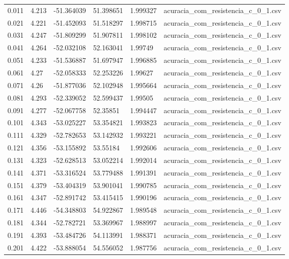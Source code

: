 \begin{table}
\begin{tabular}{llllll}
0.011 & 4.213 & -51.364039 & 51.398651 & 1.999327 & acuracia\_com\_resistencia\_c\_0\_1.csv \\
0.021 & 4.221 & -51.452093 & 51.518297 & 1.998715 & acuracia\_com\_resistencia\_c\_0\_1.csv \\
0.031 & 4.247 & -51.809299 & 51.907811 & 1.998102 & acuracia\_com\_resistencia\_c\_0\_1.csv \\
0.041 & 4.264 & -52.032108 & 52.163041 & 1.99749 & acuracia\_com\_resistencia\_c\_0\_1.csv \\
0.051 & 4.233 & -51.536887 & 51.697947 & 1.996885 & acuracia\_com\_resistencia\_c\_0\_1.csv \\
0.061 & 4.27 & -52.058333 & 52.253226 & 1.99627 & acuracia\_com\_resistencia\_c\_0\_1.csv \\
0.071 & 4.26 & -51.877036 & 52.102948 & 1.995664 & acuracia\_com\_resistencia\_c\_0\_1.csv \\
0.081 & 4.293 & -52.339052 & 52.599437 & 1.99505 & acuracia\_com\_resistencia\_c\_0\_1.csv \\
0.091 & 4.277 & -52.067758 & 52.35851 & 1.994447 & acuracia\_com\_resistencia\_c\_0\_1.csv \\
0.101 & 4.343 & -53.025227 & 53.354821 & 1.993823 & acuracia\_com\_resistencia\_c\_0\_1.csv \\
0.111 & 4.329 & -52.782653 & 53.142932 & 1.993221 & acuracia\_com\_resistencia\_c\_0\_1.csv \\
0.121 & 4.356 & -53.155892 & 53.55184 & 1.992606 & acuracia\_com\_resistencia\_c\_0\_1.csv \\
0.131 & 4.323 & -52.628513 & 53.052214 & 1.992014 & acuracia\_com\_resistencia\_c\_0\_1.csv \\
0.141 & 4.371 & -53.316524 & 53.779488 & 1.991391 & acuracia\_com\_resistencia\_c\_0\_1.csv \\
0.151 & 4.379 & -53.404319 & 53.901041 & 1.990785 & acuracia\_com\_resistencia\_c\_0\_1.csv \\
0.161 & 4.347 & -52.891742 & 53.415415 & 1.990196 & acuracia\_com\_resistencia\_c\_0\_1.csv \\
0.171 & 4.446 & -54.348803 & 54.922867 & 1.989548 & acuracia\_com\_resistencia\_c\_0\_1.csv \\
0.181 & 4.344 & -52.782721 & 53.369967 & 1.988997 & acuracia\_com\_resistencia\_c\_0\_1.csv \\
0.191 & 4.393 & -53.484726 & 54.113991 & 1.988371 & acuracia\_com\_resistencia\_c\_0\_1.csv \\
0.201 & 4.422 & -53.888054 & 54.556052 & 1.987756 & acuracia\_com\_resistencia\_c\_0\_1.csv \\

\end{tabular}
\end{table}
